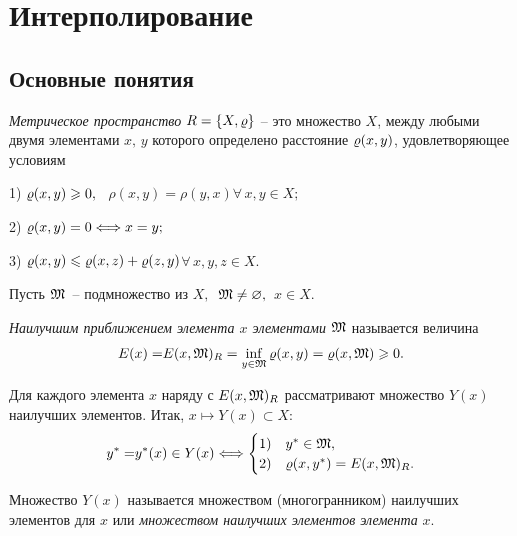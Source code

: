 
\chapter{Интерполирование}   %

\section{Основные понятия}

\begin{defi}
{\it Метрическое пространство} $R=\{X,\varrho\}$ -- это
множество $X$, между любыми двумя элементами $x,\, y$
которого определено расстояние $\varrho(x,y)$, {удовлетворяющее
условиям}

1) $\varrho(x,y)\geqslant 0,$ \ $\rho(x,y)=\rho(y,x)$\quad  $\forall \,x,y \in X;$

2) $\varrho(x,y)=0 \Longleftrightarrow x=y;$

3) $\varrho(x,y)\leqslant \varrho(x,z)+\varrho(z,y)$\quad $\forall\, x,y,z \in X.$
\end{defi}

Пусть $\mathfrak{M}$~-- подмножество из $X,$\  $\mathfrak{M} \ne \varnothing,$\  $x \in X.$

\begin{defi}    %
{\it Наилучшим приближением элемента $x$ элементами $\mathfrak{M}$} называется
величина
\[
{E(x)=}E(x,\mathfrak{M})_R=\inf_{y \in \mathfrak{M}} \varrho (x,y)=\varrho (x,\mathfrak{M}) \geqslant 0.
\]
\end{defi}

{Для каждого элемента $x$ наряду} с $E(x,\mathfrak{M})_R$
рассматривают множество $Y(x)$
наилучших элементов. {Итак,} $x \longmapsto Y(x) \subset X${:}
\[
  {y^* =} y^*{(x)} \in Y(x) \Longleftrightarrow  \begin{cases}
                            1) & y^* \in \mathfrak{M},\\
                            2)  & \varrho (x,y^*)=E(x,\mathfrak{M})_R.
                           \end{cases}
\]

\begin{defi}
{Множество} $Y(x)$ называется множеством (многогранником)
наилучших элементов для $x$ или {\it множеством наилучших элементов
элемента} $x.$
\end{defi}

